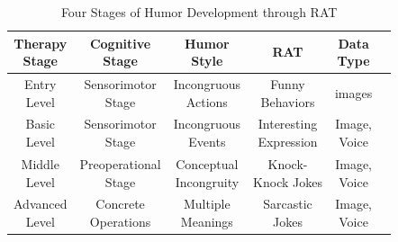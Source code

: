 \documentclass[letterpaper]{article} %
\begin{document}
\begin{table}[tbp]
\begin{center}
\caption{Four Stages of Humor Development through RAT}
\scriptsize
\begin{tabular}{cccccc} %
\hline 
\makecell{\textbf{Therapy} \\ \textbf{Stage}} & \makecell{\textbf{Cognitive} \\ \textbf{Stage}} & \makecell{\textbf{Humor} \\ \textbf{Style}} & \textbf{RAT} & \makecell{\textbf{Data} \\ \textbf{Type}}\\
\hline
\makecell{Entry \\ Level}&\makecell{Sensorimotor \\ Stage}&\makecell{Incongruous \\ Actions}&\makecell{Funny \\ Behaviors}& images\\
\hline
\makecell{Basic \\ Level}&\makecell{Sensorimotor \\ Stage}&\makecell{Incongruous \\ Events}&\makecell{Interesting \\ Expression}&\makecell{Image, \\ Voice}\\
\hline
\makecell{Middle \\ Level}&\makecell{Preoperational \\ Stage}&\makecell{Conceptual \\ Incongruity}&\makecell{Knock- \\Knock Jokes}&\makecell{Image, \\ Voice}\\
\hline
\makecell{Advanced \\ Level}&\makecell{Concrete \\ Operations}&\makecell{Multiple \\ Meanings}&\makecell{Sarcastic \\ Jokes}&\makecell{Image, \\ Voice}\\
\hline
\end{tabular}
\label{table: humor_rat}
\end{center}
\vspace{-2mm}
\end{table}
\end{document}
